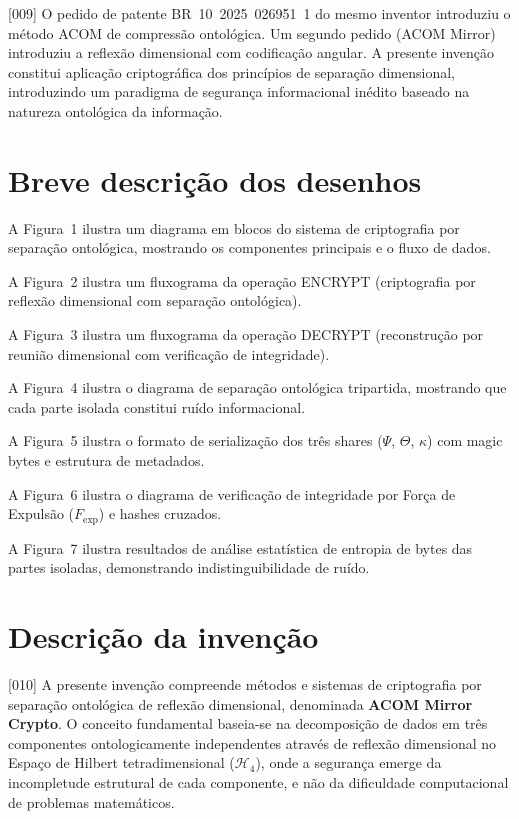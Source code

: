 \documentclass[12pt,a4paper]{article}
\newcommand{\Fexp}{F_{\text{exp}}}
\newcommand{\Hfour}{\mathcal{H}_4}
\begin{document}
{[009]} O pedido de patente BR~10~2025~026951~1 do mesmo
inventor introduziu o método ACOM de compressão ontológica. Um
segundo pedido (ACOM Mirror) introduziu a reflexão dimensional
com codificação angular. A presente invenção constitui aplicação
criptográfica dos princípios de separação dimensional,
introduzindo um paradigma de segurança informacional inédito
baseado na natureza ontológica da informação.

\section{Breve descrição dos desenhos}

A Figura~1 ilustra um diagrama em blocos do sistema de
criptografia por separação ontológica, mostrando os componentes
principais e o fluxo de dados.

A Figura~2 ilustra um fluxograma da operação ENCRYPT
(criptografia por reflexão dimensional com separação
ontológica).

A Figura~3 ilustra um fluxograma da operação DECRYPT
(reconstrução por reunião dimensional com verificação de
integridade).

A Figura~4 ilustra o diagrama de separação ontológica
tripartida, mostrando que cada parte isolada constitui ruído
informacional.

A Figura~5 ilustra o formato de serialização dos três shares
($\Psi$, $\Theta$, $\kappa$) com magic bytes e estrutura de
metadados.

A Figura~6 ilustra o diagrama de verificação de integridade por
Força de Expulsão ($\Fexp$) e hashes cruzados.

A Figura~7 ilustra resultados de análise estatística de entropia
de bytes das partes isoladas, demonstrando indistinguibilidade
de ruído.

\section{Descrição da invenção}

{[010]} A presente invenção compreende métodos e sistemas de
criptografia por separação ontológica de reflexão dimensional,
denominada \textbf{ACOM Mirror Crypto}. O conceito fundamental
baseia-se na decomposição de dados em três componentes
ontologicamente independentes através de reflexão dimensional no
Espaço de Hilbert tetradimensional ($\Hfour$), onde a segurança
emerge da incompletude estrutural de cada componente, e não da
dificuldade computacional de problemas matemáticos.
\end{document}
